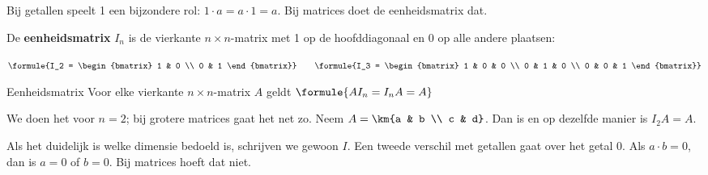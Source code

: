 Bij getallen speelt 1 een bijzondere rol: $1 \cdot a = a \cdot 1 = a$. Bij matrices doet de eenheidsmatrix dat.

\begin{theorie}
De \textbf{\textcolor{accent}{eenheidsmatrix}} $I_n$ is de vierkante $n \times n$-matrix met 1 op de hoofddiagonaal en 0 op alle andere plaatsen:

\vspace{1mm}
\qquad $\formule{I_2 = \begin{bmatrix} 1 & 0 \\ 0 & 1 \end{bmatrix}} \qquad \formule{I_3 = \begin{bmatrix} 1 & 0 & 0 \\ 0 & 1 & 0 \\ 0 & 0 & 1 \end{bmatrix}}$

\begin{stelling}{Eenheidsmatrix}
Voor elke vierkante $n \times n$-matrix $A$ geldt \quad $\formule{A I_n = I_n A = A}$
\end{stelling}

\begin{bewijs}
We doen het voor $n = 2$; bij grotere matrices gaat het net zo. Neem $A = \km{a & b \\ c & d}$. Dan is
en op dezelfde manier is $I_2 A = A$.
\end{bewijs}
\end{theorie}

Als het duidelijk is welke dimensie bedoeld is, schrijven we gewoon $I$. Een tweede verschil met getallen gaat over het getal 0. Als $a \cdot b = 0$, dan is $a = 0$ of $b = 0$. Bij matrices hoeft dat niet.

